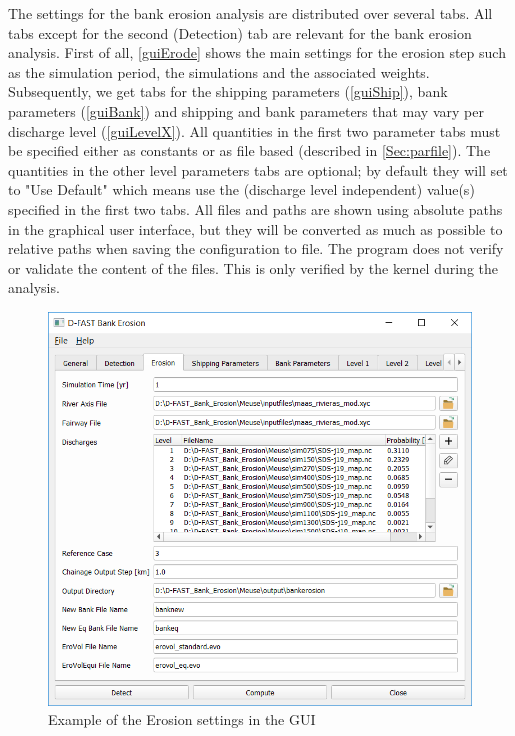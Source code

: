 The settings for the bank erosion analysis are distributed over several tabs.
All tabs except for the second (Detection) tab are relevant for the bank erosion analysis.
First of all, \autoref{guiErode} shows the main settings for the erosion step such as the simulation period, the simulations and the associated weights.
Subsequently, we get tabs for the shipping parameters (\autoref{guiShip}), bank parameters (\autoref{guiBank}) and shipping and bank parameters that may vary per discharge level (\autoref{guiLevelX}).
All quantities in the first two parameter tabs must be specified either as constants or as file based (described in \autoref{Sec:parfile}).
The quantities in the other level parameters tabs are optional; by default they will set to "Use Default" which means use the (discharge level independent) value(s) specified in the first two tabs.
All files and paths are shown using absolute paths in the graphical user interface, but they will be converted as much as possible to relative paths when saving the configuration to file.
The program does not verify or validate the content of the files.
This is only verified by the kernel during the analysis.

\begin{figure}
\center
\includegraphics[width=\textwidth]{figures/gui3.png}
\caption{Example of the Erosion settings in the GUI}
\label{guiErode}
\end{figure}

